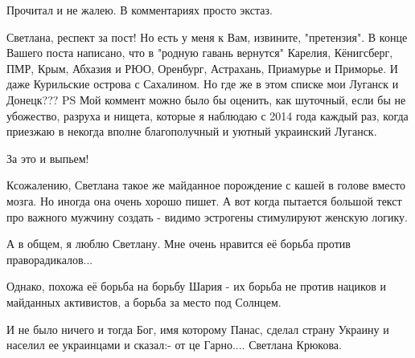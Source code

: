 \begin{itemize}
Прочитал и не жалею. В комментариях просто экстаз.

 

Светлана, респект за пост! Но есть у меня к Вам, извините, "претензия". В конце
Вашего поста написано, что в "родную гавань вернутся" Карелия, Кёнигсберг, ПМР,
Крым, Абхазия и РЮО, Оренбург, Астрахань, Приамурье и Приморье. И даже
Курильские острова с Сахалином. Но где же в этом списке мои Луганск и Донецк???
PS Мой коммент можно было бы оценить, как шуточный, если бы не убожество,
разруха и нищета, которые я наблюдаю с 2014 года каждый раз, когда приезжаю в
некогда вполне благополучный и уютный украинский Луганск.


 
За это и выпьем!🥂


 

Ксожалению, Светлана такое же майданное порождение с кашей в голове вместо
мозга. Но иногда она очень хорошо пишет. А вот когда пытается большой текст про
важного мужчину создать - видимо эстрогены стимулируют женскую логику.

А в общем, я люблю Светлану. Мне очень нравится её борьба против праворадикалов...

Однако, похожа её борьба на борьбу Шария - их борьба не против нациков и
майданных активистов, а борьба за место под Солнцем.


 

И не было ничего и тогда Бог, имя которому Панас, сделал страну Украину и
населил ее украинцами и сказал:- от це Гарно.... Светлана Крюкова.


\end{itemize}

